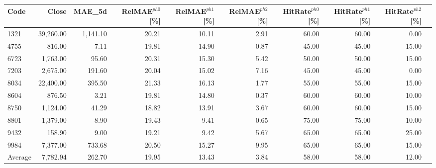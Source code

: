 \begingroup
\footnotesize
\begin{tabular}{lrrrrrrrrr}
\hline
Code & Close & MAE\_5d & RelMAE$^{ph0}$[\%] & RelMAE$^{ph1}$[\%] & RelMAE$^{ph2}$[\%] & HitRate$^{ph0}$[\%] & HitRate$^{ph1}$[\%] & HitRate$^{ph2}$[\%] \\
\hline
1321 & 39,260.00 & 1,141.10 & 20.21 & 10.11 & 2.91 & 60.00 & 60.00 & 0.00 \\
4755 & 816.00 & 7.11 & 19.81 & 14.90 & 0.87 & 45.00 & 45.00 & 15.00 \\
6723 & 1,763.00 & 95.60 & 20.31 & 15.30 & 5.42 & 50.00 & 50.00 & 15.00 \\
7203 & 2,675.00 & 191.60 & 20.04 & 15.02 & 7.16 & 45.00 & 45.00 & 0.00 \\
8034 & 22,400.00 & 395.50 & 21.33 & 16.13 & 1.77 & 55.00 & 55.00 & 15.00 \\
8604 & 876.50 & 3.21 & 19.81 & 14.80 & 0.37 & 60.00 & 60.00 & 10.00 \\
8750 & 1,124.00 & 41.29 & 18.82 & 13.91 & 3.67 & 60.00 & 60.00 & 15.00 \\
8801 & 1,379.00 & 8.90 & 19.43 & 9.41 & 0.65 & 75.00 & 75.00 & 10.00 \\
9432 & 158.90 & 9.00 & 19.21 & 9.42 & 5.67 & 65.00 & 65.00 & 25.00 \\
9984 & 7,377.00 & 733.68 & 20.50 & 15.27 & 9.95 & 65.00 & 65.00 & 15.00 \\
Average & 7,782.94 & 262.70 & 19.95 & 13.43 & 3.84 & 58.00 & 58.00 & 12.00 \\
\hline
\end{tabular}
\endgroup